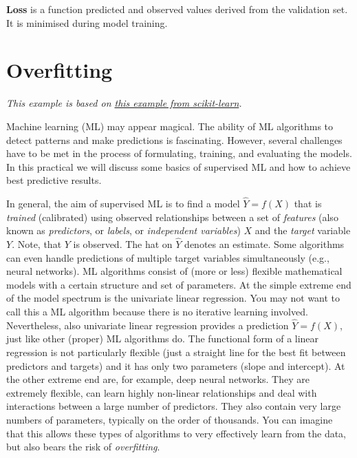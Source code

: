 \documentclass[
]{book}
\begin{document}
\textbf{Loss} is a function predicted and observed values derived from the validation set. It is minimised during model training.

\hypertarget{overfitting}{%
\section{Overfitting}\label{overfitting}}

\emph{This example is based on \href{https://scikit-learn.org/stable/auto_examples/model_selection/plot_underfitting_overfitting.html}{this example from scikit-learn}.}

Machine learning (ML) may appear magical. The ability of ML algorithms to detect patterns and make predictions is fascinating. However, several challenges have to be met in the process of formulating, training, and evaluating the models. In this practical we will discuss some basics of supervised ML and how to achieve best predictive results.

In general, the aim of supervised ML is to find a model \(\hat{Y} = f(X)\) that is \emph{trained} (calibrated) using observed relationships between a set of \emph{features} (also known as \emph{predictors}, or \emph{labels}, or \emph{independent variables}) \(X\) and the \emph{target} variable \(Y\). Note, that \(Y\) is observed. The hat on \(\hat{Y}\) denotes an estimate. Some algorithms can even handle predictions of multiple target variables simultaneously (e.g., neural networks). ML algorithms consist of (more or less) flexible mathematical models with a certain structure and set of parameters. At the simple extreme end of the model spectrum is the univariate linear regression. You may not want to call this a ML algorithm because there is no iterative learning involved. Nevertheless, also univariate linear regression provides a prediction \(\hat{Y} = f(X)\), just like other (proper) ML algorithms do. The functional form of a linear regression is not particularly flexible (just a straight line for the best fit between predictors and targets) and it has only two parameters (slope and intercept). At the other extreme end are, for example, deep neural networks. They are extremely flexible, can learn highly non-linear relationships and deal with interactions between a large number of predictors. They also contain very large numbers of parameters, typically on the order of thousands. You can imagine that this allows these types of algorithms to very effectively learn from the data, but also bears the risk of \emph{overfitting}.
\end{document}

